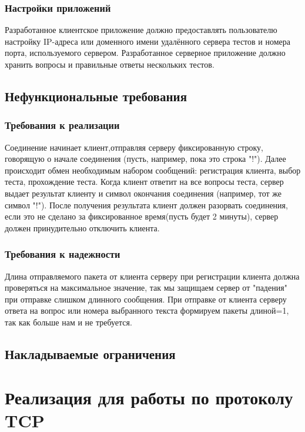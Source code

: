 \documentclass[12pt,a4paper]{report}
\begin{document}
\subsection{Настройки приложений}
Разработанное клиентское приложение
должно предоставлять пользователю настройку IP-адреса или доменного
имени удалённого сервера тестов и номера порта, используемого сервером.
Разработанное серверное приложение должно хранить вопросы и правильные ответы нескольких тестов.
\section{Нефункциональные требования}
\subsection{Требования к реализации}
Соединение начинает клиент,отправляя серверу фиксированную строку, говорящую о начале соединения (пусть, например, пока это строка "!"). Далее происходит обмен необходимым набором сообщений: регистрация клиента, выбор теста, прохождение теста.  Когда клиент ответит на все вопросы теста, сервер выдает результат клиенту и символ окончания соединения (например, тот же символ "!"). После получения результата клиент должен разорвать соединения, если это не сделано за фиксированное время(пусть будет 2 минуты), сервер должен принудительно отключить клиента.
\subsection{Требования к надежности}
Длина отправляемого пакета от клиента серверу при регистрации клиента должна проверяться на максимальное значение, так мы защищаем сервер от "падения" при отправке слишком длинного сообщения.\newline
При отправке от клиента серверу ответа на вопрос или номера выбранного текста формируем пакеты длиной=1, так как больше нам и не требуется.
\section{Накладываемые ограничения}

\chapter{Реализация для работы по протоколу TCP}
\end{document}
